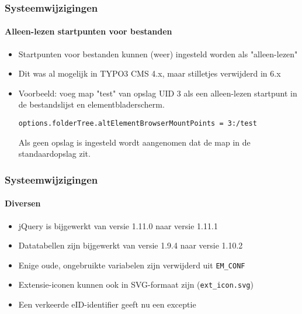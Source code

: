 
\begin{frame}[fragile]
	\frametitle{Systeemwijzigingen}
	\framesubtitle{Alleen-lezen startpunten voor bestanden}

	\begin{itemize}

		\item Startpunten voor bestanden kunnen (weer) ingesteld worden als "alleen-lezen"
		\item Dit was al mogelijk in TYPO3 CMS 4.x, maar stilletjes verwijderd in 6.x
		\item Voorbeeld: voeg map "test" van opslag UID 3 als een alleen-lezen startpunt in de bestandslijst en elementbladerscherm.\newline

			\smaller\texttt{options.folderTree.altElementBrowserMountPoints = 3:/test}\normalsize\newline

			Als geen opslag is ingesteld wordt aangenomen dat de map in de standaardopslag zit.
	\end{itemize}

\end{frame}


\begin{frame}[fragile]
	\frametitle{Systeemwijzigingen}
	\framesubtitle{Diversen}

	\begin{itemize}
		\item jQuery is bijgewerkt van versie 1.11.0 naar versie 1.11.1
		\item Datatabellen zijn bijgewerkt van versie 1.9.4 naar versie 1.10.2
		\item Enige oude, ongebruikte variabelen zijn verwijderd uit \texttt{EM\_CONF}
		\item Extensie-iconen kunnen ook in SVG-formaat zijn (\texttt{ext\_icon.svg})
		\item Een verkeerde eID-identifier geeft nu een exceptie
	\end{itemize}

\end{frame}

